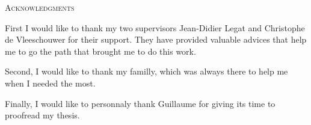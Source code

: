 
\begin{center}
\huge{\textsc{Acknowledgments}}
\end{center}
First I would like to thank my two supervisors Jean-Didier Legat and Christophe de Vleeschouwer for their support. They have provided valuable advices that help me to go the path that brought me to do this work. 

Second, I would like to thank my familly, which was always there to help me when I needed the most.

Finally, I would like to personnaly thank Guillaume for giving its time to proofread my thesis.
\afterpage{\blankpage}
\newpage
